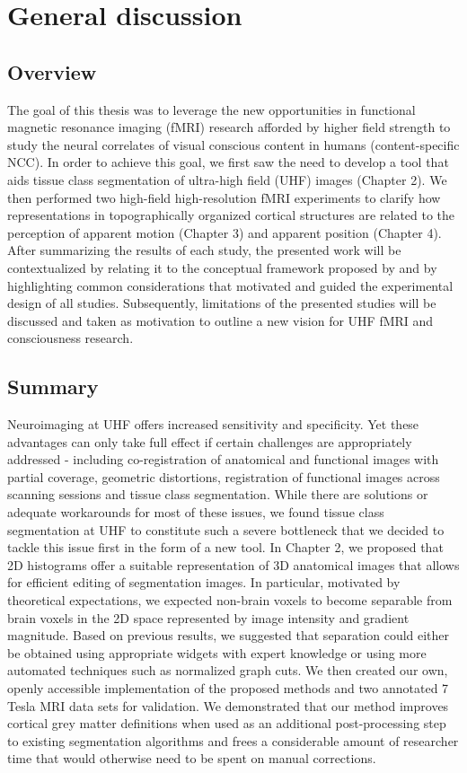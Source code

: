 \chapter{General discussion}
\label{ch:chapter05}
\clearpage{\thispagestyle{empty}\cleardoublepage}

\section{Overview}
The goal of this thesis was to leverage the new opportunities in functional magnetic resonance imaging (fMRI) research afforded by higher field strength to study the neural correlates of visual conscious content in humans (content-specific NCC). In order to achieve this goal, we first saw the need to develop a tool that aids tissue class segmentation of ultra-high field (UHF) images (Chapter 2). We then performed two high-field high-resolution fMRI experiments to clarify how representations in topographically organized cortical structures are related to the perception of apparent motion (Chapter 3) and apparent position (Chapter 4). After summarizing the results of each study, the presented work will be contextualized by relating it to the conceptual framework proposed by \cite{DeGraaf2012} and by highlighting common considerations that motivated and guided the experimental design of all studies. Subsequently, limitations of the presented studies will be discussed and taken as motivation to outline a new vision for UHF fMRI and consciousness research.

\section{Summary}
Neuroimaging at UHF offers increased sensitivity and specificity. Yet these advantages can only take full effect if certain challenges are appropriately addressed - including co-registration of anatomical and functional images with partial coverage, geometric distortions, registration of functional images across scanning sessions and tissue class segmentation. While there are solutions or adequate workarounds for most of these issues, we found tissue class segmentation at UHF to constitute such a severe bottleneck that we decided to tackle this issue first in the form of a new tool. In Chapter 2, we proposed that 2D histograms offer a suitable representation of 3D anatomical images that allows for efficient editing of segmentation images. In particular, motivated by theoretical expectations, we expected non-brain voxels to become separable from brain voxels in the 2D space represented by image intensity and gradient magnitude. Based on previous results, we suggested that separation could either be obtained using appropriate widgets with expert knowledge or using more automated techniques such as normalized graph cuts. We then created our own, openly accessible implementation of the proposed methods and two annotated 7 Tesla MRI data sets for validation. We demonstrated that our method improves cortical grey matter definitions when used as an additional post-processing step to existing segmentation algorithms and frees a considerable amount of researcher time that would otherwise need to be spent on manual corrections. 

